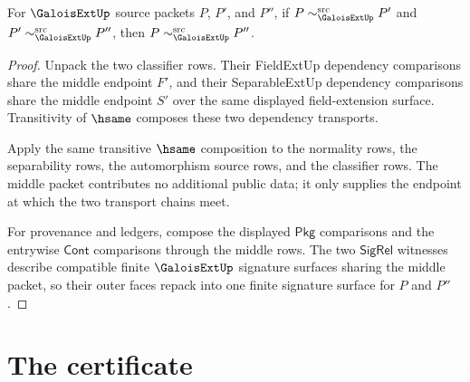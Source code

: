 \begin{theorem}
\label{thm:galoisext-source-classifier-transitive}
For $\GaloisExtUp$ source packets $P$, $P'$, and $P''$, if
$P\sim_{\GaloisExtUp}^{\mathrm{src}}P'$ and
$P'\sim_{\GaloisExtUp}^{\mathrm{src}}P''$, then
$P\sim_{\GaloisExtUp}^{\mathrm{src}}P''$.
\end{theorem}
\begin{proof}
Unpack the two classifier rows. Their FieldExtUp dependency comparisons share
the middle endpoint $F'$, and their SeparableExtUp dependency comparisons
share the middle endpoint $S'$ over the same displayed field-extension
surface. Transitivity of $\hsame$ composes these two dependency transports.

Apply the same transitive $\hsame$ composition to the normality rows, the
separability rows, the automorphism source rows, and the classifier rows. The
middle packet contributes no additional public data; it only supplies the
endpoint at which the two transport chains meet.

For provenance and ledgers, compose the displayed $\mathsf{Pkg}$ comparisons
and the entrywise $\mathsf{Cont}$ comparisons through the middle rows. The
two $\mathsf{SigRel}$ witnesses describe compatible finite
$\GaloisExtUp$ signature surfaces sharing the middle packet, so their outer
faces repack into one finite signature surface for $P$ and $P''$.
\end{proof}

\section{The certificate}
\label{sec:galoisext-certificate}


